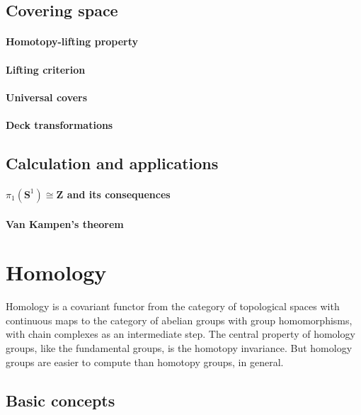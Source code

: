 \documentclass[11pt]{article}
\theoremstyle{definition}
\theoremstyle{plain}
\newcommand{\Z}{\mathbf{Z}}
\newcommand{\1}{\mathbf{1}}
\newcommand{\s}{\mathbf{S}}
\begin{document}
\subsection{Covering space}

\paragraph{Homotopy-lifting property}

\paragraph{Lifting criterion}

\paragraph{Universal covers}

\paragraph{Deck transformations}

\subsection{Calculation and applications}

\paragraph{$\pi_1(\s^1)\cong\Z$ and its consequences}

\paragraph{Van Kampen's theorem}

\newpage
\section{Homology}

Homology is a covariant functor from the category of topological spaces with continuous maps to the category of abelian groups with group homomorphisms, with chain complexes as an intermediate step. The central property of homology groups, like the fundamental groups, is the homotopy invariance. But homology groups are easier to compute than homotopy groups, in general.

\subsection{Basic concepts}
\end{document}
